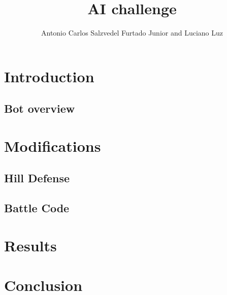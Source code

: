 \documentclass[10pt,a4paper]{coursepaper}
\title{AI challenge}
\author{Antonio Carlos Salzvedel Furtado Junior and Luciano Luz}
\begin{document}
\maketitle


\section{Introduction}

\subsection{Bot overview}

\section{Modifications}

\subsection{Hill Defense}

\subsection{Battle Code}

\section{Results}

\section{Conclusion}
\end{document}
